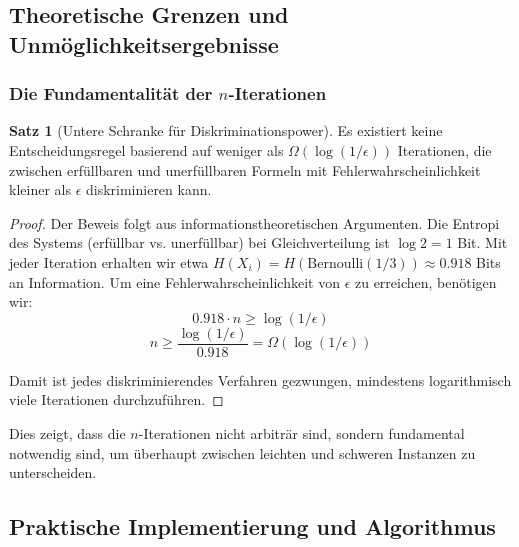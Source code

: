 ﻿\documentclass[a4paper,12pt]{article}
\theoremstyle{definition}
\newtheorem{satz}{Satz}
\begin{document}
\subsection{Theoretische Grenzen und Unmöglichkeitsergebnisse}

\subsubsection{Die Fundamentalität der $n$-Iterationen}

\begin{satz}[Untere Schranke für Diskriminationspower]
Es existiert keine Entscheidungsregel basierend auf weniger als $\Omega(\log(1/\epsilon))$ Iterationen, die zwischen erfüllbaren und unerfüllbaren Formeln mit Fehlerwahrscheinlichkeit kleiner als $\epsilon$ diskriminieren kann.
\end{satz}

\begin{proof}
Der Beweis folgt aus informationstheoretischen Argumenten. Die Entropi des Systems (erfüllbar vs. unerfüllbar) bei Gleichverteilung ist $\log 2 = 1$ Bit. Mit jeder Iteration erhalten wir etwa $H(X_i) = H(\text{Bernoulli}(1/3)) \approx 0.918$ Bits an Information. Um eine Fehlerwahrscheinlichkeit von $\epsilon$ zu erreichen, benötigen wir:
\[
0.918 \cdot n \geq \log(1/\epsilon)
\]
\[
n \geq \frac{\log(1/\epsilon)}{0.918} = \Omega(\log(1/\epsilon))
\]

Damit ist jedes diskriminierendes Verfahren gezwungen, mindestens logarithmisch viele Iterationen durchzuführen.
\end{proof}

Dies zeigt, dass die $n$-Iterationen nicht arbiträr sind, sondern fundamental notwendig sind, um überhaupt zwischen leichten und schweren Instanzen zu unterscheiden.

\subsection{Praktische Implementierung und Algorithmus}
\end{document}
